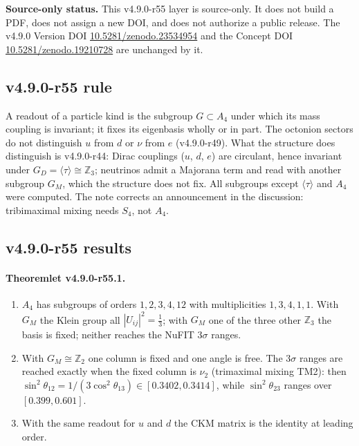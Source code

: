\noindent\textbf{Source-only status.}
This v4.9.0-r55 layer is source-only.  It does not build a PDF, does not assign a new DOI,
and does not authorize a public release.  The v4.9.0 Version DOI
\href{https://doi.org/10.5281/zenodo.23534954}{10.5281/zenodo.23534954} and the Concept DOI
\href{https://doi.org/10.5281/zenodo.19210728}{10.5281/zenodo.19210728} are unchanged by it.

\subsection*{v4.9.0-r55 rule}
\label{subsec:v490-r55-rule}

A readout of a particle kind is the subgroup \(G\subset A_4\) under which its mass coupling is invariant; it fixes its eigenbasis wholly or in part.
The octonion sectors do not distinguish \(u\) from \(d\) or \(\nu\) from \(e\) (v4.9.0-r49).  What the structure does distinguish is v4.9.0-r44:
Dirac couplings (\(u\), \(d\), \(e\)) are circulant, hence invariant under \(G_D=\langle\tau\rangle\cong\mathbb Z_3\); neutrinos admit a Majorana term and read
with another subgroup \(G_M\), which the structure does not fix.  All subgroups except \(\langle\tau\rangle\) and \(A_4\) were computed.  The note
corrects an announcement in the discussion: tribimaximal mixing needs \(S_4\), not \(A_4\).

\subsection*{v4.9.0-r55 results}
\label{subsec:v490-r55-results}

\paragraph{Theoremlet v4.9.0-r55.1.}
\begin{enumerate}[leftmargin=2em]
\item[(a)] \(A_4\) has subgroups of orders \(1,2,3,4,12\) with multiplicities \(1,3,4,1,1\).  With \(G_M\) the Klein group all \(|U_{ij}|^2=\tfrac13\); with
\(G_M\) one of the three other \(\mathbb Z_3\) the basis is fixed; neither reaches the NuFIT \(3\sigma\) ranges.
\item[(b)] With \(G_M\cong\mathbb Z_2\) one column is fixed and one angle is free.  The \(3\sigma\) ranges are reached exactly when the fixed column is \(\nu_2\)
(trimaximal mixing TM2): then \(\sin^2\theta_{12}=1/(3\cos^2\theta_{13})\in[0.3402,0.3414]\), while \(\sin^2\theta_{23}\) ranges over \([0.399,0.601]\).
\item[(c)] With the same readout for \(u\) and \(d\) the CKM matrix is the identity at leading order.
\end{enumerate}

